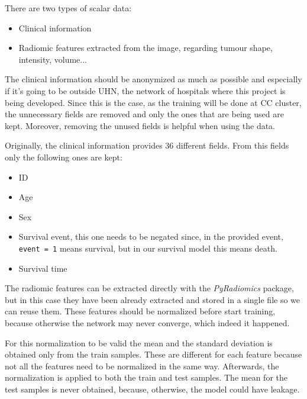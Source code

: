
There are two types of scalar data:
\begin{itemize}
  \item Clinical information
  \item Radiomic features extracted from the image, regarding tumour shape, intensity, volume...
\end{itemize}

The clinical information should be anonymized as much as possible and especially if it's going
to be outside \gls{UHN}, the network of hospitals where this project is being developed.
Since this is the case, as the training will be done at \gls{CC} cluster, the unnecessary fields
are removed and only the ones that are being used are kept. Moreover, removing the unused fields
is helpful when using the data.

Originally, the clinical information provides 36 different fields. From this fields only the 
following ones are kept:
\begin{itemize}
  \item ID
  \item Age
  \item Sex
  \item Survival event, this one needs to be negated since, in the provided event, \verb|event = 1|
        means survival, but in our survival model this means death. 
  \item Survival time
\end{itemize}

The radiomic features can be extracted directly with the \emph{PyRadiomics}
\cite{medical:py-radiomics} package, but in this case they have been already extracted and stored
in a single file so we can reuse them. These features should be normalized before start training,
because otherwise the network may never converge, which indeed it happened. 

For this normalization to be valid the mean and the standard deviation is obtained only from 
the train samples. These are different for each feature because not all the features need to 
be normalized in the same way. Afterwards, the normalization is applied to both the train 
and test samples. The mean for the test samples is never obtained, because, otherwise, the
model could have \gls{leakage}. 






